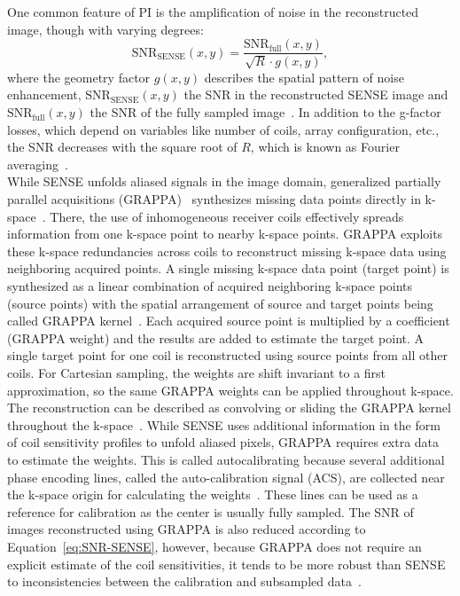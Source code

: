 One common feature of PI is the amplification of noise in the reconstructed image, though with varying degrees:
\begin{equation} \label{eq:SNR-SENSE}
	\text{SNR}_{\text{SENSE}}(x,y) = \frac{\text{SNR}_{\text{full}}(x,y)}{\sqrt{R} \cdot g(x,y)},
\end{equation}
where the geometry factor $g(x,y)$ describes the spatial pattern of noise enhancement, $\text{SNR}_{\text{SENSE}}(x,y)$ the SNR in the reconstructed SENSE image and $\text{SNR}_{\text{full}}(x,y)$ the SNR of the fully sampled image~\cite{AdvancesPI}. In addition to the g-factor losses, which depend on variables like number of coils, array configuration, etc., the SNR decreases with the square root of $R$, which is known as Fourier averaging~\cite{AdvancesPI}.\\
While SENSE unfolds aliased signals in the image domain, generalized partially parallel acquisitions (GRAPPA)~\cite{GRAPPA} synthesizes missing data points directly in k-space~\cite{ParallelMRI}. There, the use of inhomogeneous receiver coils effectively spreads information from one k-space point to nearby k-space points. GRAPPA exploits these k-space redundancies across coils to reconstruct missing k-space data using neighboring acquired points. A single missing k-space data point (target point) is synthesized as a linear combination of acquired neighboring k-space points (source points) with the spatial arrangement of source and target points being called GRAPPA kernel~\cite{ParallelMRI}. Each acquired source point is multiplied by a coefficient (GRAPPA weight) and the results are added to estimate the target point. A single target point for one coil is reconstructed using source points from all other coils. For Cartesian sampling, the weights are shift invariant to a first approximation, so the same GRAPPA weights can be applied throughout k-space. The reconstruction can be described as convolving or sliding the GRAPPA kernel throughout the k-space~\cite{AdvancesPI}. While SENSE uses additional information in the form of coil sensitivity profiles to unfold aliased pixels, GRAPPA requires extra data to estimate the weights. This is called autocalibrating because several additional phase encoding lines, called the auto-calibration signal (ACS), are collected near the k-space origin for calculating the weights~\cite{ParallelMRI}. These lines can be used as a reference for calibration as the center is usually fully sampled. The SNR of images reconstructed using GRAPPA is also reduced according to Equation~\ref{eq:SNR-SENSE}, however, because GRAPPA does not require an explicit estimate of the coil sensitivities, it tends to be more robust than SENSE to inconsistencies between the calibration and subsampled data~\cite{AdvancesPI}.\\
